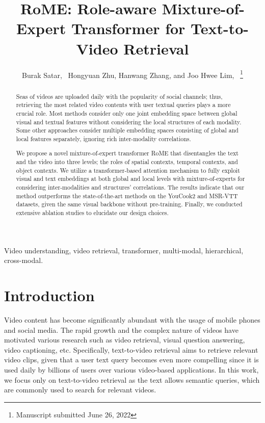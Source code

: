 \documentclass[lettersize,journal]{IEEEtran}
\begin{document}
\title{RoME: Role-aware Mixture-of-Expert Transformer for Text-to-Video Retrieval}

\author{Burak Satar,~ Hongyuan Zhu, Hanwang Zhang, and Joo Hwee Lim,~
\thanks{Manuscript submitted June 26, 2022}}





\maketitle

\begin{abstract}
Seas of videos are uploaded daily with the popularity of social channels; thus, retrieving the most related video contents with user textual queries plays a more crucial role. Most methods consider only one joint embedding space between global visual and textual features without considering the local structures of each modality. Some other approaches consider multiple embedding spaces consisting of global and local features separately, ignoring rich inter-modality correlations.

We propose a novel mixture-of-expert transformer RoME that disentangles the text and the video into three levels; the roles of spatial contexts, temporal contexts, and object contexts.  
We utilize a transformer-based attention mechanism to fully exploit visual and text embeddings at both global and local levels with mixture-of-experts for considering inter-modalities and structures' correlations. The results indicate that our method outperforms the state-of-the-art methods on the YouCook2 and MSR-VTT datasets, given the same visual backbone without pre-training. Finally, we conducted extensive ablation studies to elucidate our design choices.

\end{abstract}

\begin{IEEEkeywords}
Video understanding, video retrieval, transformer, multi-modal, hierarchical, cross-modal.
\end{IEEEkeywords}

\section{Introduction}

Video content has become significantly abundant with the usage of mobile phones and social media. The rapid growth and the complex nature of videos have motivated various research such as video retrieval, visual question answering, video captioning, etc. Specifically, text-to-video retrieval aims to retrieve relevant video clips, given that a user text query becomes even more compelling since it is used daily by billions of users over various video-based applications. In this work, we focus only on text-to-video retrieval as the text allows semantic queries, which are commonly used to search for relevant videos.
\end{document}
